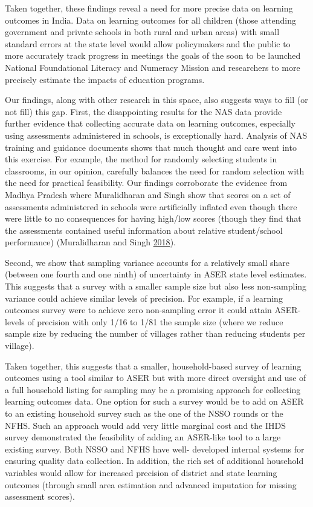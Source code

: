 \documentclass[
  11pt,
]{article}
\begin{document}
Taken together, these findings reveal a need for more precise data on learning outcomes in India. Data on learning outcomes for all children (those attending government and private schools in both rural and urban areas) with small standard errors at the state level would allow policymakers and the public to more accurately track progress in meetings the goals of the soon to be launched National Foundational Literacy and Numeracy Mission and researchers to more precisely estimate the impacts of education programs.

Our findings, along with other research in this space, also suggests ways to fill (or not fill) this gap. First, the disappointing results for the NAS data provide further evidence that collecting accurate data on learning outcomes, especially using assessments administered in schools, is exceptionally hard. Analysis of NAS training and guidance documents shows that much thought and care went into this exercise. For example, the method for randomly selecting students in classrooms, in our opinion, carefully balances the need for random selection with the need for practical feasibility. Our findings corroborate the evidence from Madhya Pradesh where Muralidharan and Singh show that scores on a set of assessments administered in schools were artificially inflated even though there were little to no consequences for having high/low scores (though they find that the assessments contained useful information about relative student/school performance) (Muralidharan and Singh \protect\hyperlink{ref-muralidharan2018improving}{2018}).

Second, we show that sampling variance accounts for a relatively small share (between one fourth and one ninth) of uncertainty in ASER state level estimates. This suggests that a survey with a smaller sample size but also less non-sampling variance could achieve similar levels of precision. For example, if a learning outcomes survey were to achieve zero non-sampling error it could attain ASER-levels of precision with only 1/16 to 1/81 the sample size (where we reduce sample size by reducing the number of villages rather than reducing students per village).

Taken together, this suggests that a smaller, household-based survey of learning outcomes using a tool similar to ASER but with more direct oversight and use of a full household listing for sampling may be a promising approach for collecting learning outcomes data. One option for such a survey would be to add on ASER to an existing household survey such as the one of the NSSO rounds or the NFHS. Such an approach would add very little marginal cost and the IHDS survey demonstrated the feasibility of adding an ASER-like tool to a large existing survey. Both NSSO and NFHS have well- developed internal systems for ensuring quality data collection. In addition, the rich set of additional household variables would allow for increased precision of district and state learning outcomes (through small area estimation and advanced imputation for missing assessment scores).
\end{document}
